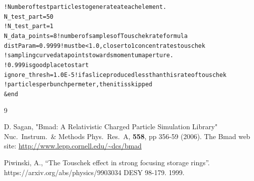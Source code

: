 \documentclass[11pt]{article}
\newlength{\ExBeg}
\newlength{\ExEnd}
\newenvironment{example}
  {\vspace{\ExBeg} \begin{alltt}}
  {\end{alltt} \vspace{\ExEnd}}
\begin{document}
\begin{example}
  ! Number of test particles to generate at each element.
  N_test_part = 50
  !N_test_part = 1
  N_data_points = 8  ! number of samples of Touschek rate formula
  distParam = 0.9999 ! must be < 1.0, closer to 1 concentrates touschek 
                     ! sampling curve data points towards momentum aperture.  
                     ! 0.999 is good place to start
  ignore_thresh = 1.0E-5 !if a slice produced less than this rate of touschek 
                         !particles per bunch per meter,then it is skipped
&end
\end{example}


\begin{thebibliography}{9}

D. Sagan,
"Bmad: A Relativistic Charged Particle Simulation Library"
Nuc.\ Instrum.\ \& Methods Phys.\ Res.\ A, {\bf 558}, pp 356-59 (2006).
The Bmad web site:
\hfill\break
\hspace*{0.3in} \url{http://www.lepp.cornell.edu/~dcs/bmad}

Piwinski, A., ``The Touschek effect in strong focusing storage rings''.
https://arxiv.org/abs/physics/9903034
DESY 98-179.  1999.

\end{thebibliography}
\end{document}
